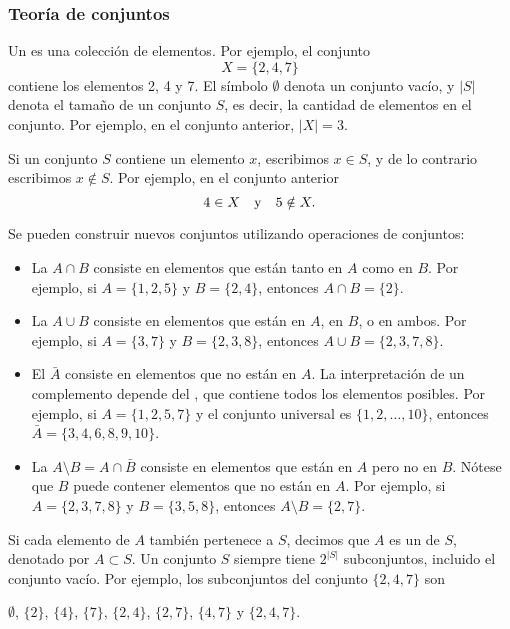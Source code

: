 \subsubsection{Teoría de conjuntos}


Un  es una colección de elementos.
Por ejemplo, el conjunto
\[X=\{2,4,7\}\]
contiene los elementos 2, 4 y 7.
El símbolo $\emptyset$ denota un conjunto vacío,
y $|S|$ denota el tamaño de un conjunto $S$,
es decir, la cantidad de elementos en el conjunto.
Por ejemplo, en el conjunto anterior, $|X|=3$.

Si un conjunto $S$ contiene un elemento $x$,
escribimos $x \in S$,
y de lo contrario escribimos $x \notin S$.
Por ejemplo, en el conjunto anterior
\[4 \in X \hspace{10px}\textrm{y}\hspace{10px} 5 \notin X.\]

\begin{samepage}
Se pueden construir nuevos conjuntos utilizando operaciones de conjuntos:
\begin{itemize}
\item La  $A \cap B$ consiste en elementos
que están tanto en $A$ como en $B$.
Por ejemplo, si $A=\{1,2,5\}$ y $B=\{2,4\}$,
entonces $A \cap B = \{2\}$.
\item La  $A \cup B$ consiste en elementos
que están en $A$, en $B$, o en ambos.
Por ejemplo, si $A=\{3,7\}$ y $B=\{2,3,8\}$,
entonces $A \cup B = \{2,3,7,8\}$.
\item El  $\bar A$ consiste en elementos
que no están en $A$.
La interpretación de un complemento depende del
, que contiene todos los elementos posibles.
Por ejemplo, si $A=\{1,2,5,7\}$ y el conjunto universal es
$\{1,2,\ldots,10\}$, entonces $\bar A = \{3,4,6,8,9,10\}$.
\item La  $A \setminus B = A \cap \bar B$
consiste en elementos que están en $A$ pero no en $B$.
Nótese que $B$ puede contener elementos que no están en $A$.
Por ejemplo, si $A=\{2,3,7,8\}$ y $B=\{3,5,8\}$,
entonces $A \setminus B = \{2,7\}$.
\end{itemize}
\end{samepage}

Si cada elemento de $A$ también pertenece a $S$,
decimos que $A$ es un  de $S$,
denotado por $A \subset S$.
Un conjunto $S$ siempre tiene $2^{|S|}$ subconjuntos,
incluido el conjunto vacío.
Por ejemplo, los subconjuntos del conjunto $\{2,4,7\}$ son
\begin{center}
$\emptyset$,
$\{2\}$, $\{4\}$, $\{7\}$, $\{2,4\}$, $\{2,7\}$, $\{4,7\}$ y $\{2,4,7\}$.
\end{center}

